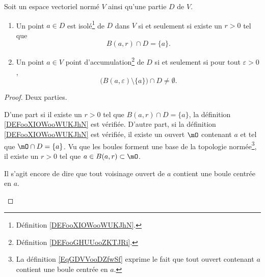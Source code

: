 \begin{lemma}       \label{LEMooOMVNooVBlQMD}
	Soit un espace vectoriel normé \( V\) ainsi qu'une partie \( D\) de \( V\).
	\begin{enumerate}
		\item
		      Un point \( a\in D\) est isolé\footnote{Définition \ref{DEFooXIOWooWUKJhN}.} de \( D\) dans \( V\) si et seulement si existe un \( r>0\) tel que
		      \begin{equation}
			      B(a,r)\cap D=\{ a \}.
		      \end{equation}
		\item
		      Un point \( a\in V\) point d'accumulation\footnote{Définition \ref{DEFooGHUUooZKTJRi}.} de \( D\) si et seulement si pour tout \( \varepsilon>0\),
		      \begin{equation}
			      \Big( B(a,\varepsilon)\setminus\{ a \}\Big)\cap D\neq \emptyset.
		      \end{equation}
	\end{enumerate}
\end{lemma}

\begin{proof}
	Deux parties.
	\begin{subproof}
		D'une part si il existe un \( r>0\) tel que \( B(a,r)\cap D=\{ a \}\), la définition \ref{DEFooXIOWooWUKJhN} est vérifiée. D'autre part, si la définition \ref{DEFooXIOWooWUKJhN} est vérifiée, il existe un ouvert \( \mO\) contenant \( a\) et tel que \( \mO\cap D=\{ a \}\). Vu que les boules forment une base de la topologie normée\footnote{La définition \eqref{EqGDVVooDZfwSf} exprime le fait que tout ouvert contenant \( a\) contient une boule centrée en \( a\).}, il existe un \( r>0\) tel que \( a\in B(a,r)\subset \mO\).

		Il s'agit encore de dire que tout voisinage ouvert de \( a\) contient une boule centrée en \( a\).
	\end{subproof}
\end{proof}

\newcommand{\CaptionFigAccumulationIsole}{L'ensemble décrit par l'équation \eqref{Eq2807BouleIso}. Le point \( P\) est un point isolé de \( D\), tandis que  les points \( S\) et \( Q\) sont des points d'accumulation.}


